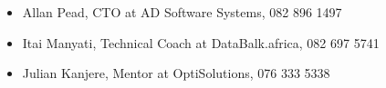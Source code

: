 \documentclass[a4paper]{twentysecondcv} %
\begin{document}
\begin{itemize}
    \item Allan Pead, CTO at AD Software Systems, 082 896 1497
    \item Itai Manyati, Technical Coach at DataBalk.africa, 082 697 5741
    \item Julian Kanjere, Mentor at OptiSolutions, 076 333 5338
    
\end{itemize}










\end{document}
